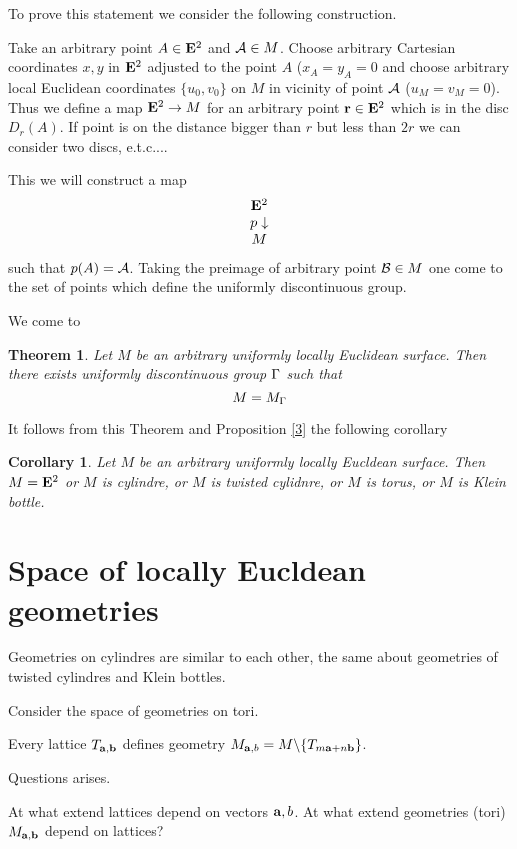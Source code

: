 \documentclass[12pt]{article}
\newtheorem{theorem}{Theorem}
\newtheorem{corollary}{Corollary}
\theoremstyle{definition}
\numberwithin{equation}{section}
\begin{document}
To prove this statement we consider the 
following construction.

Take an arbitrary point $A\in {\bf E}^2$ 
and ${\cal A}\in M$. Choose  arbitrary Cartesian
coordinates $x,y$ in ${\bf E}^2$ adjusted to the point
$A$ ($x_A=y_A=0$ and choose 
arbitrary local Euclidean 
coordinates  $\{u_0,v_0\}$ on $M$
in vicinity of point ${\cal A}$ ($u_M=v_M=0$).
Thus we define a map ${\bf E}^2\to M$
  for an arbitrary point ${\bf r}\in {\bf E}^2$
which is in the disc $D_r(A)$.
If point is on the distance bigger than $r$
but less than $2r$ we can consider two discs, e.t.c....


This we will construct a map
   $$
  \begin{matrix}
        {\bf E}^2\cr
         p\downarrow\cr
          M\cr
     \end{matrix}
      $$
such that $p(A)={\cal A}$.
Taking the preimage of arbitrary point
${\cal B}\in M$ one come to the set of points
 which define the uniformly discontinuous group.


We come to 

\begin{theorem}  Let $M$ be an arbitrary 
uniformly locally Euclidean surface. Then there
exists uniformly discontinuous group
  ${\Gamma}$ such that 
       $$
    M=M_{\Gamma}
       $$
\end{theorem}

It follows from this Theorem and Proposition \ref{3}
the following corollary

\begin{corollary} Let  $M$
be an arbitrary uniformly locally Eucldean
surface. Then $M={\bf E}^2$ or $M$ is cylindre,
or $M$ is twisted cylidnre,
or $M$ is torus, or $M$ is Klein bottle.
\end{corollary}


\section {Space of locally Eucldean geometries}

  Geometries on cylindres are similar to each other,
  the same about geometries of twisted cylindres and Klein 
bottles.

  Consider the space of geometries on tori.

Every lattice $T_{{\bf a},{\bf b}}$ defines
geometry $M_{{\bf a},b}=M\backslash 
{\{T_{m{\bf a}+n{\bf b}}\}}$.

Questions arises. 

  At what extend lattices depend on vectors
${\bf a},b$. At what extend geometries (tori)
 $M_{{\bf a},{\bf b}}$ depend on lattices?
\end{document}
